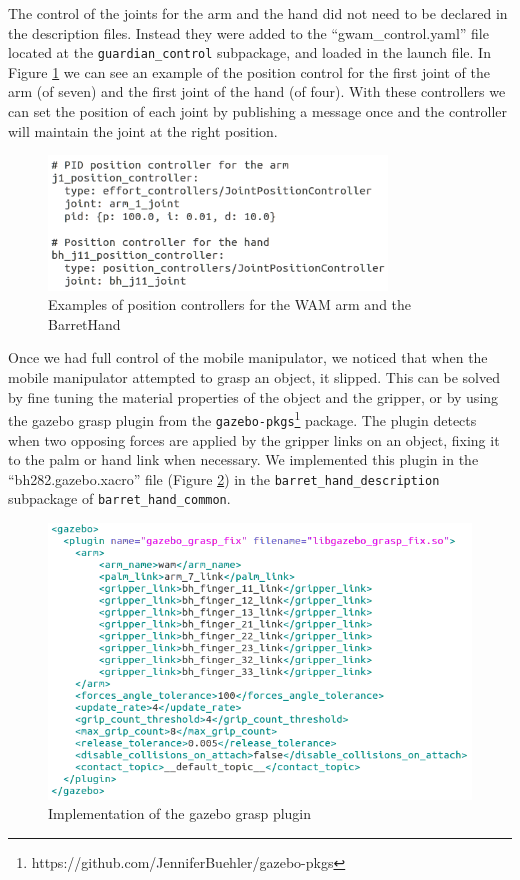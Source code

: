 \documentclass[11pt,a4paper]{article}
\begin{document}
The control of the joints for the arm and the hand did not need to be declared in the description files. Instead they were added to the ``gwam\_control.yaml'' file located at the \verb!guardian_control! subpackage, and loaded in the launch file. In Figure \ref{fig:armcontrol} we can see an example of the position control for the first joint of the arm (of seven) and the first joint of the hand (of four). With these controllers we can set the position of each joint by publishing a message once and the controller will maintain the joint at the right position.

\begin{figure}[ht]	
	\centering
	\includegraphics[width=9cm]{arm_yaml.png}
	\caption{Examples of position controllers for the WAM arm and the BarretHand}
	\label{fig:armcontrol}
\end{figure}

Once we had full control of the mobile manipulator, we noticed that when the mobile manipulator attempted to grasp an object, it slipped. This can be solved by fine tuning the material properties of the object and the gripper, or by using the gazebo grasp plugin from the \verb!gazebo-pkgs!\footnote{https://github.com/JenniferBuehler/gazebo-pkgs} package. The plugin detects when two opposing forces are applied by the gripper links on an object, fixing it to the palm or hand link when necessary. We implemented this plugin in the ``bh282.gazebo.xacro'' file (Figure \ref{fig:graspcontrol}) in the \verb!barret_hand_description! subpackage of \verb!barret_hand_common!.

\begin{figure}[ht]	
	\centering
	\includegraphics[width=12cm]{grasp_plugin.png}
	\caption{Implementation of the gazebo grasp plugin}
	\label{fig:graspcontrol}
\end{figure}
\end{document}
